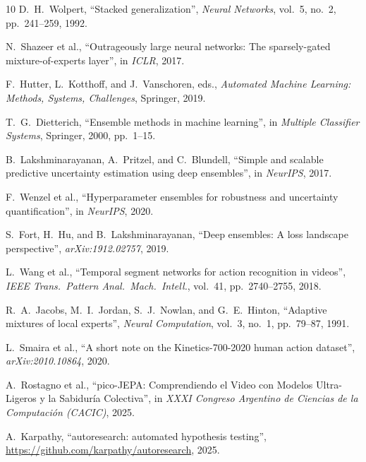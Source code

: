 \documentclass[runningheads]{llncs}
\begin{document}
{\begin{thebibliography}{10}
D.~H.~Wolpert,
``Stacked generalization'',
\emph{Neural Networks}, vol.\ 5, no.\ 2, pp.\ 241--259, 1992.

N.~Shazeer et al.,
``Outrageously large neural networks: The sparsely-gated mixture-of-experts
layer'',
in \emph{ICLR}, 2017.


F.~Hutter, L.~Kotthoff, and J.~Vanschoren, eds.,
\emph{Automated Machine Learning: Methods, Systems, Challenges},
Springer, 2019.

T.~G.~Dietterich,
``Ensemble methods in machine learning'',
in \emph{Multiple Classifier Systems}, Springer, 2000, pp.\ 1--15.

B.~Lakshminarayanan, A.~Pritzel, and C.~Blundell,
``Simple and scalable predictive uncertainty estimation using deep ensembles'',
in \emph{NeurIPS}, 2017.

F.~Wenzel et al.,
``Hyperparameter ensembles for robustness and uncertainty quantification'',
in \emph{NeurIPS}, 2020.

S.~Fort, H.~Hu, and B.~Lakshminarayanan,
``Deep ensembles: A loss landscape perspective'',
\emph{arXiv:1912.02757}, 2019.

L.~Wang et al.,
``Temporal segment networks for action recognition in videos'',
\emph{IEEE Trans.\ Pattern Anal.\ Mach.\ Intell.}, vol.\ 41,
pp.\ 2740--2755, 2018.

R.~A.~Jacobs, M.~I.~Jordan, S.~J.~Nowlan, and G.~E.~Hinton,
``Adaptive mixtures of local experts'',
\emph{Neural Computation}, vol.\ 3, no.\ 1, pp.\ 79--87, 1991.

L.~Smaira et al.,
``A short note on the Kinetics-700-2020 human action dataset'',
\emph{arXiv:2010.10864}, 2020.

A.~Rostagno et al.,
``pico-JEPA: Comprendiendo el Video con Modelos Ultra-Ligeros y la
Sabiduría Colectiva'',
in \emph{XXXI Congreso Argentino de Ciencias de la Computación (CACIC)}, 2025.

A.~Karpathy,
``autoresearch: automated hypothesis testing'',
\url{https://github.com/karpathy/autoresearch}, 2025.

\end{thebibliography}
}
\end{document}
